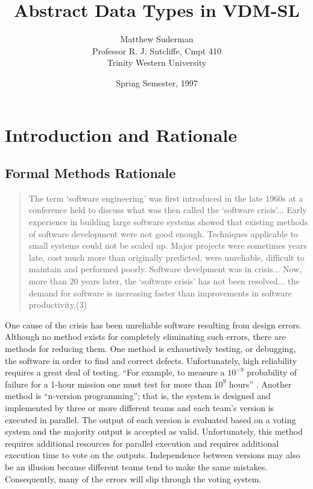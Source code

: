 \documentclass[11pt]{article}
\title{Abstract Data Types in VDM-SL}
\author{Matthew Suderman\\Professor R. J. Sutcliffe, Cmpt 410\\Trinity Western University}
\date{Spring Semester, 1997}
\begin{document}
\maketitle
\thispagestyle{empty}

\newpage
{}
\pagestyle{plain}
\tableofcontents

\newpage
{}
\setcounter{page}{1}

\section{Introduction and Rationale}

\subsection{Formal Methods Rationale}
\begin{quote}
The term `software engineering' was first introduced in the late 1960s at a conference held to discuss what was then called the `software crisis'...  Early experience in building large software systems showed that existing methods of software development were not good enough.  Techniques applicable to small systems could not be scaled up.  Major projects were sometimes years late, cost much more than originally predicted, were unreliable, difficult to maintain and performed poorly.  Software develpment was in crisis...  Now, more than 20 years later, the `software crisis' has not been resolved... the demand for software is increasing faster than improvements in software productivity.(3)  \cite{SI}
\end{quote}

One cause of the crisis has been unreliable software resulting from design errors.  Although no method exists for completely eliminating such errors, there are methods for reducing them.  One method is exhaustively testing, or debugging, the software in order to find and correct defects.  Unfortunately, high reliability requires a great deal of testing.  ``For example, to measure a $10^{-9}$ probability of failure for a 1-hour mission one must test for more than $10^{9}$ hours'' \cite{HM}.  Another method is ``n-version programming''; that is, the system is designed and implemented by three or more different teams and each team's version is executed in parallel.  The output of each version is evaluated based on a voting system and the majority output is accepted as valid.  Unfortunately, this method requires additional resources for parallel execution and requires additional execution time to vote on the outputs.  Independence between versions may also be an illusion because different teams tend to make the same mistakes.  Consequently, many of the errors will slip through the voting system.\\
\end{document}
